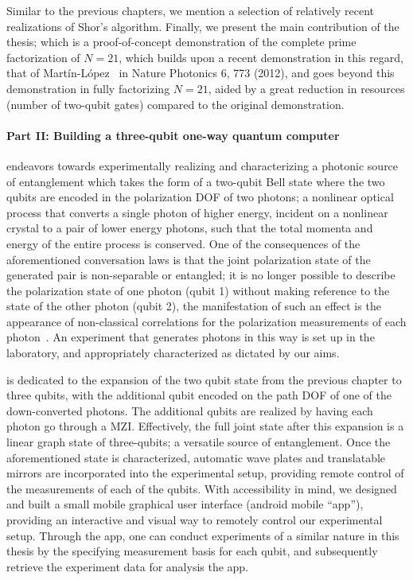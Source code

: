 \clearpage
\noindent
Similar to the previous chapters, we mention a selection of relatively recent realizations of Shor's algorithm. Finally, we present the main contribution of the thesis; which is a proof-of-concept demonstration of the complete prime factorization of ${N=21}$, which builds upon a recent demonstration in this regard, that of Mart\'in-L\'{o}pez ~\etal in Nature Photonics 6, 773 (2012), and goes beyond this demonstration in fully factorizing ${N=21}$, aided by a great reduction in resources (number of two-qubit gates) compared to the original demonstration.

\paragraph{Part II: Building a three-qubit one-way quantum computer}

\noindent
{} endeavors towards experimentally realizing and characterizing a photonic source of entanglement which takes the form of a two-qubit Bell state where the two qubits are encoded in the polarization \gls{DOF} of two photons; a nonlinear optical process that converts a single photon of higher energy, incident on a nonlinear crystal to a pair of lower energy photons, such that the total momenta and energy of the entire process is conserved. One of the consequences of the aforementioned conversation laws is that the joint polarization state of the generated pair is non-separable or entangled; it is no longer possible to describe the polarization state of one photon (qubit 1) without making reference to the state of the other photon (qubit 2), the manifestation of such an effect is the appearance of non-classical correlations for the polarization measurements of each photon~\cite{HARIHARAN_1996}. An experiment that generates photons in this way is set up in the laboratory, and appropriately characterized as dictated by our aims.

\bigskip
\noindent
{} is dedicated to the expansion of the two qubit state from the previous chapter to three qubits, with the additional qubit encoded on the path \acs{DOF} of one of the down-converted photons. The additional qubits are realized by having each photon go through a \gls{MZI}. Effectively, the full joint state after this expansion is a linear graph state of three-qubits; a versatile source of entanglement. Once the aforementioned state is characterized, automatic wave plates and translatable mirrors are incorporated into the experimental setup, providing remote control of the measurements of each of the qubits. With accessibility in mind, we designed and built a small mobile graphical user interface (android mobile \enquote{app}), providing an interactive and visual way to remotely control our experimental setup. Through the app, one can conduct experiments of a similar nature in this thesis by the specifying measurement basis for each qubit, and subsequently retrieve the experiment data for analysis \via the app.

